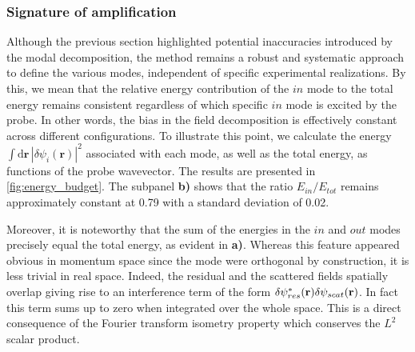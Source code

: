 \subsubsection{Signature of amplification}
Although the previous section highlighted potential inaccuracies introduced by the modal decomposition, the method remains a robust and systematic approach to define the various modes, independent of specific experimental realizations. By this, we mean that the relative energy contribution of the \( in \) mode to the total energy remains consistent regardless of which specific \( in \) mode is excited by the probe. 
In other words, the bias in the field decomposition is effectively constant across different configurations.  
To illustrate this point, we calculate the energy \( \int \mathrm{d}\mathbf{r} \, |\delta\psi_i(\mathbf{r})|^2 \) associated with each mode, as well as the total energy, as functions of the probe wavevector. The results are presented in \autoref{fig:energy_budget}. 
The subpanel \textbf{b)} shows that the ratio \( E_{in}/E_{tot} \) remains approximately constant at 0.79 with a standard deviation of 0.02.  


Moreover, it is noteworthy that the sum of the energies in the \( in \) and \( out \) modes precisely equal the total energy, as evident in \textbf{a)}. Whereas this feature appeared obvious in momentum space since the mode were orthogonal by construction, it is less trivial in real space.
Indeed, the residual and the scattered fields spatially overlap giving rise to an interference term of the form $\delta \psi_{res}^*(\mathbf{r}) \delta \psi_{scat}(\mathbf{r})$. In fact 
this term sums up to zero when integrated over the whole space.
This is a direct consequence of the Fourier transform isometry property which conserves the $L^2$ scalar product.

\bigskip

